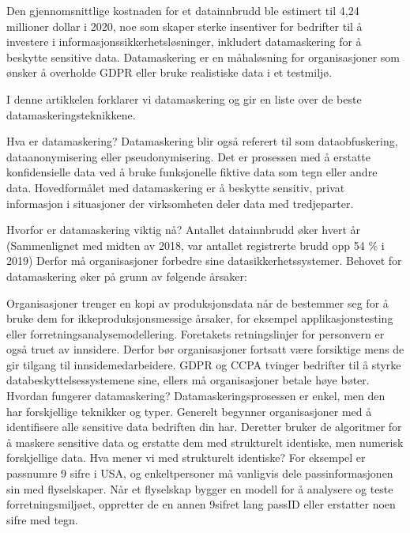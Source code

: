 \documentclass[letterpaper,10pt,english]{jupyterBook}
\begin{document}
\sphinxAtStartPar
Den gjennomsnittlige kostnaden for et datainnbrudd ble estimert til 4,24 millioner dollar i 2020, noe som skaper sterke insentiver for bedrifter til å investere i informasjonssikkerhetsløsninger, inkludert datamaskering for å beskytte sensitive data. Datamaskering er en må\sphinxhyphen{}ha\sphinxhyphen{}løsning for organisasjoner som ønsker å overholde GDPR eller bruke realistiske data i et testmiljø.

\sphinxAtStartPar
I denne artikkelen forklarer vi datamaskering og gir en liste over de beste datamaskeringsteknikkene.

\sphinxAtStartPar
Hva er datamaskering?
Datamaskering blir også referert til som dataobfuskering, dataanonymisering eller pseudonymisering. Det er prosessen med å erstatte konfidensielle data ved å bruke funksjonelle fiktive data som tegn eller andre data. Hovedformålet med datamaskering er å beskytte sensitiv, privat informasjon i situasjoner der virksomheten deler data med tredjeparter.

\sphinxAtStartPar
Hvorfor er datamaskering viktig nå?
Antallet datainnbrudd øker hvert år (Sammenlignet med midten av 2018, var antallet registrerte brudd opp 54 \% i 2019) Derfor må organisasjoner forbedre sine datasikkerhetssystemer. Behovet for datamaskering øker på grunn av følgende årsaker:

\sphinxAtStartPar
Organisasjoner trenger en kopi av produksjonsdata når de bestemmer seg for å bruke dem for ikke\sphinxhyphen{}produksjonsmessige årsaker, for eksempel applikasjonstesting eller forretningsanalysemodellering.
Foretakets retningslinjer for personvern er også truet av innsidere. Derfor bør organisasjoner fortsatt være forsiktige mens de gir tilgang til innsidemedarbeidere.
GDPR og CCPA tvinger bedrifter til å styrke databeskyttelsessystemene sine, ellers må organisasjoner betale høye bøter.
Hvordan fungerer datamaskering?
Datamaskeringsprosessen er enkel, men den har forskjellige teknikker og typer. Generelt begynner organisasjoner med å identifisere alle sensitive data bedriften din har. Deretter bruker de algoritmer for å maskere sensitive data og erstatte dem med strukturelt identiske, men numerisk forskjellige data. Hva mener vi med strukturelt identiske? For eksempel er passnumre 9 sifre i USA, og enkeltpersoner må vanligvis dele passinformasjonen sin med flyselskaper. Når et flyselskap bygger en modell for å analysere og teste forretningsmiljøet, oppretter de en annen 9\sphinxhyphen{}sifret lang pass\sphinxhyphen{}ID eller erstatter noen sifre med tegn.
\end{document}
